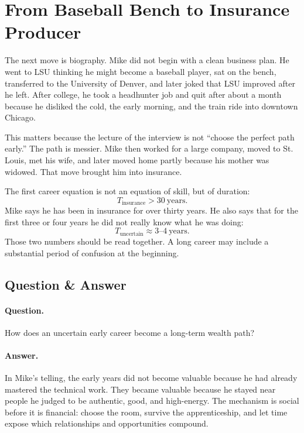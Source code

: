 \section{From Baseball Bench to Insurance Producer}

The next move is biography. Mike did not begin with a clean business plan. He went to LSU thinking he might become a baseball player, sat on the bench, transferred to the University of Denver, and later joked that LSU improved after he left. After college, he took a headhunter job and quit after about a month because he disliked the cold, the early morning, and the train ride into downtown Chicago.

This matters because the lecture of the interview is not ``choose the perfect path early.'' The path is messier. Mike then worked for a large company, moved to St. Louis, met his wife, and later moved home partly because his mother was widowed. That move brought him into insurance.

The first career equation is not an equation of skill, but of duration:
\begin{equation}
T_{\text{insurance}} > 30 \ \text{years}.
\end{equation}
Mike says he has been in insurance for over thirty years. He also says that for the first three or four years he did not really know what he was doing:
\begin{equation}
T_{\text{uncertain}} \approx 3\text{--}4 \ \text{years}.
\end{equation}
Those two numbers should be read together. A long career may include a substantial period of confusion at the beginning.

\subsection{Question \& Answer}

\paragraph{Question.}
How does an uncertain early career become a long-term wealth path?

\paragraph{Answer.}
In Mike's telling, the early years did not become valuable because he had already mastered the technical work. They became valuable because he stayed near people he judged to be authentic, good, and high-energy. The mechanism is social before it is financial: choose the room, survive the apprenticeship, and let time expose which relationships and opportunities compound.


